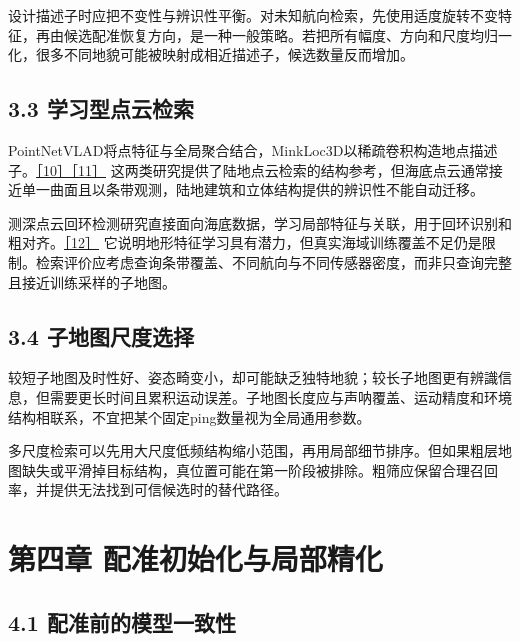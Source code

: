 设计描述子时应把不变性与辨识性平衡。对未知航向检索，先使用适度旋转不变特征，再由候选配准恢复方向，是一种一般策略。若把所有幅度、方向和尺度均归一化，很多不同地貌可能被映射成相近描述子，候选数量反而增加。

\hypertarget{ux5b66ux4e60ux578bux70b9ux4e91ux68c0ux7d22}{%
\subsection{3.3 学习型点云检索}\label{ux5b66ux4e60ux578bux70b9ux4e91ux68c0ux7d22}}

PointNetVLAD将点特征与全局聚合结合，MinkLoc3D以稀疏卷积构造地点描述子。\href{https://arxiv.org/abs/1804.03492}{［10］}\href{https://arxiv.org/abs/2011.04530}{［11］} 这两类研究提供了陆地点云检索的结构参考，但海底点云通常接近单一曲面且以条带观测，陆地建筑和立体结构提供的辨识性不能自动迁移。

测深点云回环检测研究直接面向海底数据，学习局部特征与关联，用于回环识别和粗对齐。\href{https://arxiv.org/abs/2209.08578}{［12］} 它说明地形特征学习具有潜力，但真实海域训练覆盖不足仍是限制。检索评价应考虑查询条带覆盖、不同航向与不同传感器密度，而非只查询完整且接近训练采样的子地图。

\hypertarget{ux5b50ux5730ux56feux5c3aux5ea6ux9009ux62e9}{%
\subsection{3.4 子地图尺度选择}\label{ux5b50ux5730ux56feux5c3aux5ea6ux9009ux62e9}}

较短子地图及时性好、姿态畸变小，却可能缺乏独特地貌；较长子地图更有辨識信息，但需要更长时间且累积运动误差。子地图长度应与声呐覆盖、运动精度和环境结构相联系，不宜把某个固定ping数量视为全局通用参数。

多尺度检索可以先用大尺度低频结构缩小范围，再用局部细节排序。但如果粗层地图缺失或平滑掉目标结构，真位置可能在第一阶段被排除。粗筛应保留合理召回率，并提供无法找到可信候选时的替代路径。

\hypertarget{ux7b2cux56dbux7ae0-ux914dux51c6ux521dux59cbux5316ux4e0eux5c40ux90e8ux7cbeux5316}{%
\section{第四章 配准初始化与局部精化}\label{ux7b2cux56dbux7ae0-ux914dux51c6ux521dux59cbux5316ux4e0eux5c40ux90e8ux7cbeux5316}}

\hypertarget{ux914dux51c6ux524dux7684ux6a21ux578bux4e00ux81f4ux6027}{%
\subsection{4.1 配准前的模型一致性}\label{ux914dux51c6ux524dux7684ux6a21ux578bux4e00ux81f4ux6027}}

